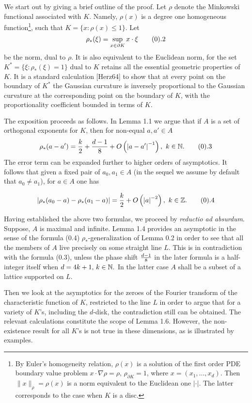 We start out by giving a brief outline of the proof.  Let $\rho$
denote the Minkowski functional associated with $K$. Namely,
$\rho(x)$ is a degree one homogeneous function\footnote{By
Euler's  homogeneity relation,  $\rho(x)$ is a solution of the
first order PDE boundary value problem
$x\cdot\nabla\rho=\rho,\,\rho_{\partial K}=1$, where
$x=(x_1,\ldots,x_d)$. Then $\|x\|_\rho=\rho(x)$ is a norm
equivalent to the Euclidean one $|\cdot|$. The latter
corresponds to the case when $K$ is a disc.}, such that
$K=\{x:\rho(x) \leq 1\}$. Let
$$ \rho_*(\xi)=\sup_{x \in \partial K}x \cdot \xi \tag0.2$$
be the norm, dual to $\rho$. It is also equivalent to the
Euclidean norm,  for the set $K^{*}=\{\xi: \rho_*(\xi)=1\}$ dual
to $K$ retains all the essential geometric properties of $K$. It
is a standard calculation [Herz64] to show that at every point
on the boundary of $K^{*}$ the Gaussian curvature is inversely
proportional to the Gaussian curvature at the corresponding
point on the boundary of $K$, with the proportionality
coefficient bounded in terms of $K$.

The exposition proceeds as follows. In Lemma 1.1 we argue
that if $A$ is a set of orthogonal exponents for $K$, then for
non-equal $a,a'\in A$
$$\rho_*(a-a')=\frac{k}{2}+{d-1\over8}+O
\left({|a-a'|}^{-1} \right), \ k \in {\Bbb N}. \tag0.3$$ The
error term can be expanded further to higher orders of
asymptotics. It follows that  given a fixed pair of $a_0,a_1\in
A$ (in the sequel we assume by default that $a_0\neq a_1$), for
$a\in A$ one has

$$|\rho_*(a_0-a)- \rho_*(a_1-a)|=\frac{k}{2}+O
\left({|a|}^{-2} \right), \ k \in {\Bbb Z}. \tag0.4$$

Having established the above two formulas, we proceed by {\it
reductio ad absurdum}.  Suppose, $A$ is maximal and  infinite.
Lemma 1.4 provides an asymptotic in the sense of the formula
(0.4) $\rho_*$-generalization of Lemma 0.2 in order to see that
all the members of $A$ live precisely on some straight line $L$.
This is in contradiction with the formula (0.3), unless the
phase shift ${d-1\over8}$ in the later formula is a half-integer
itself when $d=4k+1,\,k\in{\Bbb N}.$ In the latter case $A$
shall be a subset of a lattice supported on $L$.

Then we look at the asymptotics for the zeroes of the Fourier
transform of the characteristic function of $K$, restricted to
the line $L$ in order to argue that for a variety of $K$'s,
including the $d$-disk, the contradiction still can be obtained.
The relevant calculations constitute the scope of Lemma 1.6.
However, the non-existence result for all $K$'s is not true in
these dimensions, as is illustrated by examples.

